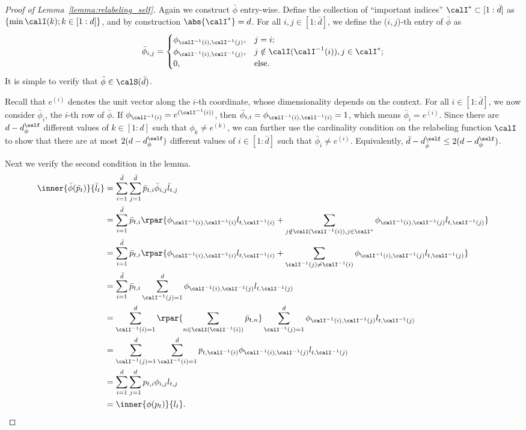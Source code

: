 \documentclass[10pt]{article}
\begin{document}
\begin{proof}[Proof of Lemma~\ref{lemma:relabeling_self}]
Again we construct $\bar\phi$ entry-wise. Define the collection of ``important indices'' $\calI^*\subset[1:\bar d]$ as $\{\min\calI(k);k\in[1:d]\}$, and by construction $\abs{\calI^*}=d$. For all $i,j\in[1:\bar d]$, we define the ($i,j$)-th entry of $\bar\phi$ as
\begin{equation*}
\bar\phi_{i,j}=\begin{cases}
\phi_{\calI^{-1}(i),\calI^{-1}(j)},& j=i;\\
\phi_{\calI^{-1}(i),\calI^{-1}(j)},& j\notin\calI(\calI^{-1}(i)),j\in\calI^*;\\
0,& \textrm{else}.
\end{cases}
\end{equation*}
It is simple to verify that $\bar\phi\in\calS(\bar d)$. 

Recall that $e^{(i)}$ denotes the unit vector along the $i$-th coordinate, whose dimensionality depends on the context. For all $i\in[1:\bar d]$, we now consider $\bar\phi_i$, the $i$-th row of $\bar\phi$. If $\phi_{\calI^{-1}(i)}=e^{(\calI^{-1}(i))}$, then $\bar\phi_{i,i}=\phi_{\calI^{-1}(i),\calI^{-1}(i)}=1$, which means $\bar\phi_i=e^{(i)}$. Since there are $d-d^\self_\phi$ different values of $k\in[1:d]$ such that $\phi_k\neq e^{(k)}$, we can further use the cardinality condition on the relabeling function $\calI$ to show that there are at most $2(d-d^\self_\phi)$ different values of $i\in[1:\bar d]$ such that $\bar\phi_i\neq e^{(i)}$. Equivalently, $\bar d-d^\self_{\bar\phi}\leq 2(d-d^\self_\phi)$.

Next we verify the second condition in the lemma. 
\begin{align*}
\inner{\bar \phi(\bar p_t)}{\bar l_t}&=\sum_{i=1}^{\bar d}\sum_{j=1}^{\bar d}\bar p_{t,i}\bar\phi_{i,j}\bar l_{t,j}\\
&=\sum_{i=1}^{\bar d}\bar p_{t,i}\rpar{\phi_{\calI^{-1}(i),\calI^{-1}(i)}l_{t,\calI^{-1}(i)}+\sum_{j\notin\calI(\calI^{-1}(i)),j\in\calI^*}\phi_{\calI^{-1}(i),\calI^{-1}(j)}l_{t,\calI^{-1}(j)}}\\
&=\sum_{i=1}^{\bar d}\bar p_{t,i}\rpar{\phi_{\calI^{-1}(i),\calI^{-1}(i)}l_{t,\calI^{-1}(i)}+\sum_{\calI^{-1}(j)\neq\calI^{-1}(i)}\phi_{\calI^{-1}(i),\calI^{-1}(j)}l_{t,\calI^{-1}(j)}}\\
&=\sum_{i=1}^{\bar d}\bar p_{t,i}\sum_{\calI^{-1}(j)=1}^d\phi_{\calI^{-1}(i),\calI^{-1}(j)}l_{t,\calI^{-1}(j)}\\
&=\sum_{\calI^{-1}(i)=1}^{d}\rpar{\sum_{n\in\calI(\calI^{-1}(i))}\bar p_{t,n}}\sum_{\calI^{-1}(j)=1}^d\phi_{\calI^{-1}(i),\calI^{-1}(j)}l_{t,\calI^{-1}(j)}\\
&=\sum_{\calI^{-1}(j)=1}^{d}\sum_{\calI^{-1}(i)=1}^{d}p_{t,\calI^{-1}(i)}\phi_{\calI^{-1}(i),\calI^{-1}(j)}l_{t,\calI^{-1}(j)}\\
&=\sum_{i=1}^{d}\sum_{j=1}^{d}p_{t,i}\phi_{i,j}l_{t,j}\\
&=\inner{\phi(p_t)}{l_t}.\qedhere
\end{align*}
\end{proof}
\end{document}
